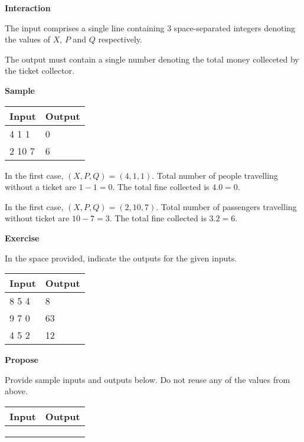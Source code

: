 \documentclass[a4paper]{exam}
\newcommand\heading[1]{\textbf{#1}}
\begin{document}
\begin{questions}
    \heading{Interaction}

    The input comprises a single line containing 3 space-separated integers denoting the values of $X$, $P$ and $Q$ respectively.

    The output must contain a single number denoting the total money colleceted by the ticket collector.

    \heading{Sample}

    \begin{tabularx}{\textwidth}{|X|X|}
        \rowcolor{gray!50}
        \hline
        Input  & Output \\ \hline\hline
        4 1 1  & 0      \\\hline
        2 10 7 & 6      \\\hline
    \end{tabularx}

    In the first case, $(X,P,Q)=(4,1,1)$. Total number of people travelling without a ticket are $1-1=0$. The total fine collected is $4.0=0$.

    In the first case, $(X,P,Q)=(2,10,7)$. Total number of passengers travelling without ticket are $10-7=3$. The total fine collected is $3.2=6$.

    \heading{Exercise}

    In the space provided, indicate the outputs for the given inputs.

    \begin{tabularx}{\textwidth}{|X|X|}
        \rowcolor{gray!50}
        \hline
        Input & Output \\ \hline\hline
        8 5 4 & 8      \\\hline
        9 7 0 & 63     \\\hline
        4 5 2 & 12     \\\hline
    \end{tabularx}

    \heading{Propose}

    Provide sample inputs and outputs below. Do not reuse any of the values from above.

    \begin{tabularx}{\textwidth}{|X|X|}
        \rowcolor{gray!50}
        \hline
        Input & Output \\ \hline\hline
              &        \\\hline
              &        \\\hline
              &        \\\hline
    \end{tabularx}


\end{questions}
\end{document}
